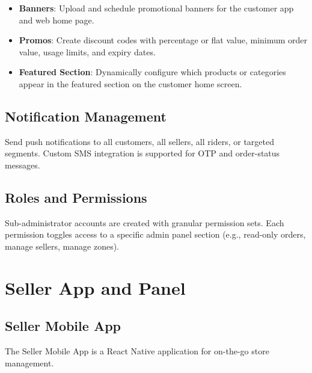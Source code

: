 \documentclass[12pt, a4paper, oneside]{report}
\begin{document}
\begin{itemize}
  \item \textbf{Banners}: Upload and schedule promotional banners for the
        customer app and web home page.
  \item \textbf{Promos}: Create discount codes with percentage or flat value,
        minimum order value, usage limits, and expiry dates.
  \item \textbf{Featured Section}: Dynamically configure which products or
        categories appear in the featured section on the customer home screen.
\end{itemize}

\subsection{Notification Management}

Send push notifications to all customers, all sellers, all riders, or targeted
segments. Custom SMS integration is supported for OTP and order-status messages.

\subsection{Roles and Permissions}

Sub-administrator accounts are created with granular permission sets. Each
permission toggles access to a specific admin panel section (e.g., read-only
orders, manage sellers, manage zones).

\section{Seller App and Panel}

\subsection{Seller Mobile App}

The Seller Mobile App is a React Native application for on-the-go store
management.
\end{document}
